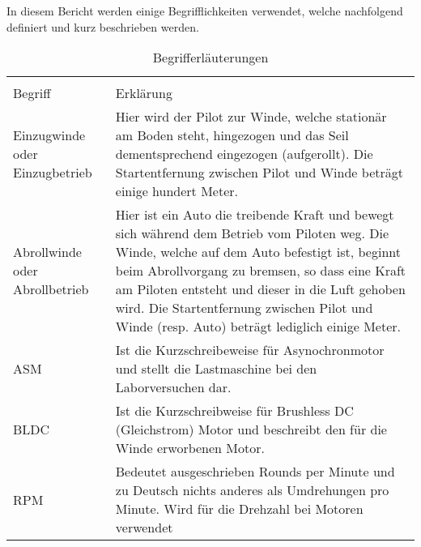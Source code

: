 In diesem Bericht werden einige Begrifflichkeiten verwendet, welche nachfolgend definiert und kurz beschrieben werden.
\begin{table}[H]
	\centering
	\begin{tabular}{p{3cm} p{11cm}}
		\multicolumn{2}{c}{}\\
		{Begriff} & {Erklärung} \\ \hline
		Einzugwinde oder Einzugbetrieb    &   Hier wird der Pilot zur Winde, welche stationär am Boden steht, hingezogen und das Seil dementsprechend eingezogen (aufgerollt). Die Startentfernung zwischen Pilot und Winde beträgt einige hundert Meter.   \\
		Abrollwinde oder Abrollbetrieb    &    Hier ist ein Auto die treibende Kraft und bewegt sich während dem Betrieb vom Piloten weg. Die Winde, welche auf dem Auto befestigt ist, beginnt beim Abrollvorgang zu bremsen, so dass eine Kraft am Piloten entsteht und dieser in die Luft gehoben wird. Die Startentfernung zwischen Pilot und Winde (resp. Auto) beträgt lediglich einige Meter.  \\
		ASM    &  Ist die Kurzschreibeweise für Asynochronmotor und stellt die Lastmaschine bei den Laborversuchen dar. \\
		BLDC    &  Ist die Kurzschreibweise für Brushless DC (Gleichstrom) Motor und beschreibt den für die Winde erworbenen Motor. \\
		RPM   & Bedeutet ausgeschrieben Rounds per Minute und zu Deutsch nichts anderes als Umdrehungen pro Minute. Wird für die Drehzahl bei Motoren verwendet 
	\end{tabular}
	\caption{Begrifferläuterungen}
	\label{tab:Begrifferlaeuterungen}
\end{table}


